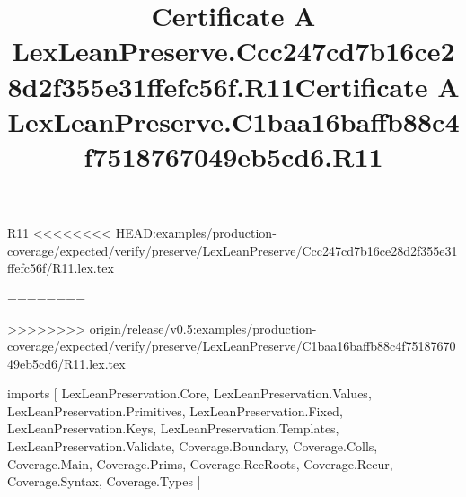 \begin{lexlean}{R11}
<<<<<<<< HEAD:examples/production-coverage/expected/verify/preserve/LexLeanPreserve/Ccc247cd7b16ce28d2f355e31ffefc56f/R11.lex.tex
\title{Certificate A LexLeanPreserve.Ccc247cd7b16ce28d2f355e31ffefc56f.R11}
========
\title{Certificate A LexLeanPreserve.C1baa16baffb88c4f7518767049eb5cd6.R11}
>>>>>>>> origin/release/v0.5:examples/production-coverage/expected/verify/preserve/LexLeanPreserve/C1baa16baffb88c4f7518767049eb5cd6/R11.lex.tex
\begin{coremodule}
imports [
  LexLeanPreservation.Core,
  LexLeanPreservation.Values,
  LexLeanPreservation.Primitives,
  LexLeanPreservation.Fixed,
  LexLeanPreservation.Keys,
  LexLeanPreservation.Templates,
  LexLeanPreservation.Validate,
  Coverage.Boundary,
  Coverage.Colls,
  Coverage.Main,
  Coverage.Prims,
  Coverage.RecRoots,
  Coverage.Recur,
  Coverage.Syntax,
  Coverage.Types
]


\end{coremodule}
\end{lexlean}
